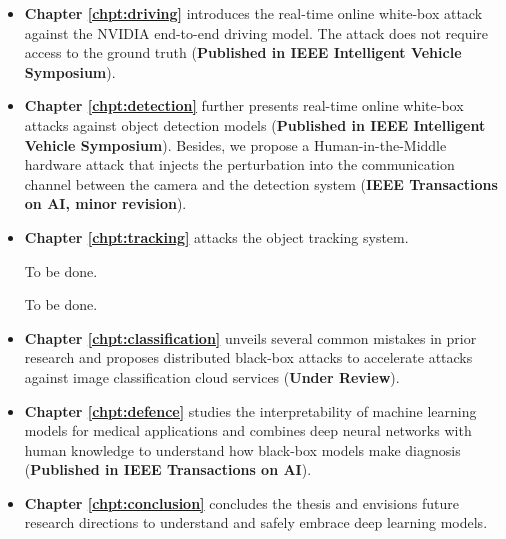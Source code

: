 \begin{itemize}[label={}]
    \item \textbf{Chapter \ref{chpt:driving}} introduces the real-time online white-box attack against the NVIDIA end-to-end driving model. The attack does not require access to the ground truth (\textbf{Published in IEEE Intelligent Vehicle Symposium}).
    \item \textbf{Chapter \ref{chpt:detection}} further presents real-time online white-box attacks against object detection models (\textbf{Published in IEEE Intelligent Vehicle Symposium}). Besides, we propose a Human-in-the-Middle hardware attack that injects the perturbation into the communication channel between the camera and the detection system (\textbf{IEEE Transactions on AI, minor revision}).
    \item \textbf{Chapter \ref{chpt:tracking}} attacks the object tracking system.

    To be done.

    To be done.

    \item \textbf{Chapter \ref{chpt:classification}} unveils several common mistakes in prior research and proposes distributed black-box attacks to accelerate attacks against image classification cloud services (\textbf{Under Review}).
    \item \textbf{Chapter \ref{chpt:defence}} studies the interpretability of machine learning models for medical applications and combines deep neural networks with human knowledge to understand how black-box models make diagnosis (\textbf{Published in IEEE Transactions on AI}).
    \item \textbf{Chapter \ref{chpt:conclusion}} concludes the thesis and envisions future research directions to understand and safely embrace deep learning models. 
\end{itemize}


